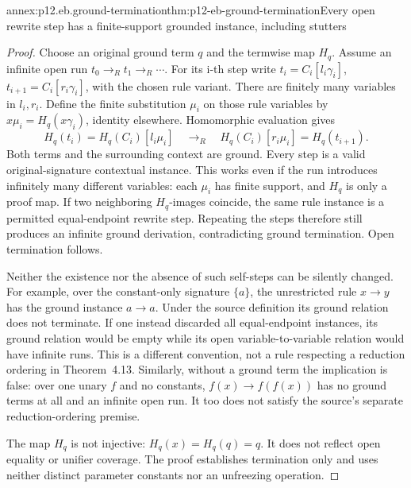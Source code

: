 \begin{annexitem}{annex:p12.eb.ground-termination}{thm:p12-eb-ground-termination}{Every open rewrite step has a finite-support grounded instance, including stutters}
\begin{proof}
Choose an original ground term \(q\) and the termwise map \(H_q\).
Assume an infinite open run \(t_0\to_Rt_1\to_R\cdots\).
For its i-th step write
\(t_i=C_i[l_i\gamma_i]\),
\(t_{i+1}=C_i[r_i\gamma_i]\), with the chosen rule variant.
There are finitely many variables in \(l_i,r_i\). Define the
finite substitution \(\mu_i\) on those rule variables by
\(x\mu_i=H_q(x\gamma_i)\), identity elsewhere. Homomorphic
evaluation gives
\[
 H_q(t_i)=H_q(C_i)[l_i\mu_i]
       \quad\longrightarrow_R\quad
 H_q(C_i)[r_i\mu_i]=H_q(t_{i+1}).
\]
Both terms and the surrounding context are ground. Every step
is a valid original-signature contextual instance. This works
even if the run introduces infinitely many different variables:
each \(\mu_i\) has finite support, and \(H_q\) is only a proof map.
If two neighboring \(H_q\)-images coincide, the same rule instance
is a permitted equal-endpoint rewrite step. Repeating the steps
therefore still produces an infinite ground derivation, contradicting
ground termination. Open termination follows.

Neither the existence nor the absence of such self-steps can be
silently changed. For example, over the constant-only signature
\(\{a\}\), the unrestricted rule \(x\to y\) has the ground instance
\(a\to a\). Under the source definition its ground relation does not
terminate. If one instead discarded all equal-endpoint instances,
its ground relation would be empty while its open variable-to-variable
relation would have infinite runs. This is a different convention,
not a rule respecting a reduction ordering in Theorem~4.13.
Similarly, without a ground term the implication is false: over
one unary \(f\) and no constants, \(f(x)\to f(f(x))\) has no ground terms
at all and an infinite open run. It too does not satisfy the
source's separate reduction-ordering premise.

The map \(H_q\) is not injective: \(H_q(x)=H_q(q)=q\). It does not
reflect open equality or unifier coverage. The proof establishes
termination only and uses neither distinct parameter constants
nor an unfreezing operation.
\end{proof}
\end{annexitem}

